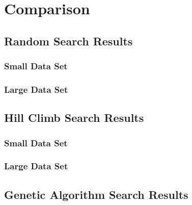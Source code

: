 \documentclass[11pt, a4paper]{article}
\begin{document}
\section{Comparison}
\subsection{Random Search Results}
\subsubsection{Small Data Set} %
\label{ssub:random_small_data_set}
 

\subsubsection{Large Data Set} %
\label{ssub:random_large_data_set}
 

\subsection{Hill Climb Search Results}
\subsubsection{Small Data Set} %
\label{ssub:hill_small_data_set}
 

\subsubsection{Large Data Set} %
\label{ssub:hill_large_data_set}
 

\subsection{Genetic Algorithm Search Results}
\end{document}
